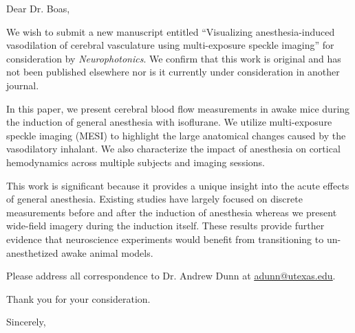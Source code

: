 \documentclass[12pt]{letter}
\begin{document}
\begin{letter}{}

\opening{Dear Dr. Boas,}

We wish to submit a new manuscript entitled ``Visualizing anesthesia-induced vasodilation of cerebral vasculature using multi-exposure speckle imaging'' for consideration by \emph{Neurophotonics}. We confirm that this work is original and has not been published elsewhere nor is it currently under consideration in another journal.

In this paper, we present cerebral blood flow measurements in awake mice during the induction of general anesthesia with isoflurane. We utilize multi-exposure speckle imaging (MESI) to highlight the large anatomical changes caused by the vasodilatory inhalant. We also characterize the impact of anesthesia on cortical hemodynamics across multiple subjects and imaging sessions.

This work is significant because it provides a unique insight into the acute effects of general anesthesia. Existing studies have largely focused on discrete measurements before and after the induction of anesthesia whereas we present wide-field imagery during the induction itself. These results provide further evidence that neuroscience experiments would benefit from transitioning to un-anesthetized awake animal models.

Please address all correspondence to Dr. Andrew Dunn at \href{mailto:adunn@utexas.edu}{\underline{adunn@utexas.edu}}.

Thank you for your consideration.

\closing{Sincerely,}

\end{letter}
\end{document}
